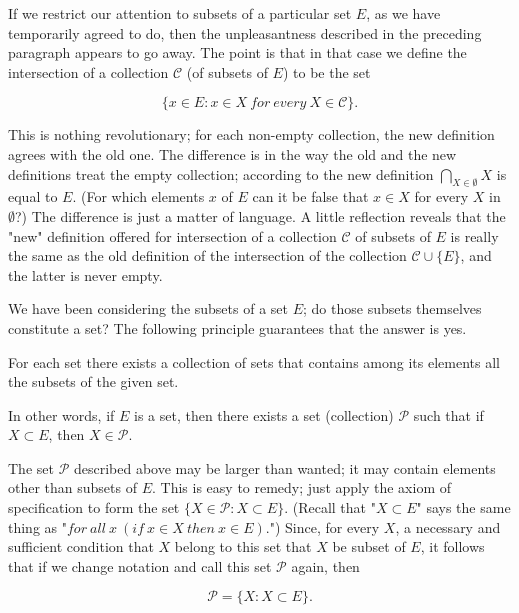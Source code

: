 If we restrict our attention to subsets of a particular set $E$, as we have temporarily agreed to do, then the unpleasantness described in the preceding paragraph appears to go away. The point is that in that case we define the intersection of a collection $ \mathcal{C} $ (of subsets of $E$) to be the set 

\begin{equation*}
\{ x \in E: x \in X \: for \: every \: X \in \mathcal{C} \}.
\end{equation*}

This is nothing revolutionary; for each non-empty collection, the new definition agrees with the old one. The difference is in the way the old and the new definitions treat the empty collection; according to the new definition  $\bigcap_{X \in \emptyset} X$ is equal to $E$. (For which elements $x$ of $E$ can it be false that $x \in X$ for every $X$ in $\emptyset $?) The difference is just a matter of language. A little reflection reveals that the "new" definition offered for intersection of a collection $ \mathcal{C} $ of subsets of $E$ is really the same as the old definition of the intersection of the collection $ \mathcal{C} \cup \{ E \} $, and the latter is never empty. 

We have been considering the subsets of a set $E$; do those subsets themselves constitute a set? The following principle guarantees that the answer is yes.

\begin{named}  For each set there exists a collection of sets that contains among its elements all the subsets of the given set. 
\end{named}

In other words, if $E$ is a set, then there exists a set (collection) $ \mathcal{P} $ such that if $X \subset E$, then $X \in \mathcal{P}$.
 
The set $ \mathcal{P} $ described above may be larger than wanted; it may contain elements other than subsets of $E$. This is easy to remedy; just apply the axiom of specification to form the set $ \{ X \in \mathcal{P}: X \subset E \} $. (Recall that "$ X \subset E $"  says the same thing as "$for \: all \: x \:(if \: x \in X \: then \: x \in E) $.") Since, for every $X$, a necessary and sufficient condition that $X$ belong to this set that $X$ be subset of $E$, it follows that if we change notation and call this set $ \mathcal{P} $ again, then 

\begin{equation*}
\mathcal{P} = \{ X : X \subset E \} .
\end{equation*}

